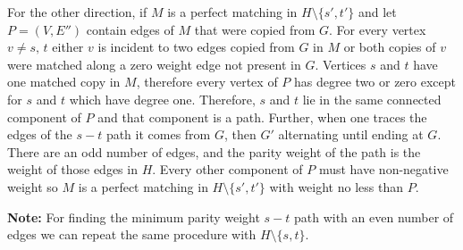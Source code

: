 \documentclass{article}
\numberwithin{equation}{section}
\begin{document}
For the other direction, if $M$ is a perfect matching in $H\setminus\{s', t'\}$ and let $P = (V, E'')$ contain edges of $M$ that were copied from $G$. For every vertex $v\not= s, \, t$ either $v$ is incident to two edges copied from $G$ in $M$ or both copies of $v$ were matched along a zero weight edge not present in $G$. Vertices $s$ and $t$ have one matched copy in $M$, therefore every vertex of $P$ has degree two or zero except for $s$ and $t$ which have degree one. Therefore, $s$ and $t$ lie in the same connected component of $P$ and that component is a path. Further, when one traces the edges of the $s-t$ path it comes from $G$, then $G'$ alternating until ending at $G$. There are an odd number of edges, and the parity weight of the path is the weight of those edges in $H$. Every other component of $P$ must have non-negative weight so $M$ is a perfect matching in $H\setminus\{s', t'\}$ with weight no less than $P$. 

\textbf{Note:} For finding the minimum parity weight $s-t$ path with an even number of edges we can repeat the same procedure with $H\setminus\{s, t\}$. 
\newpage
\end{document}

